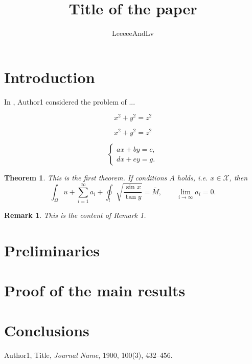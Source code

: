 \documentclass{article}
\title{Title of the paper}
\author{LeeeeeAndLv}
\date{}
\newtheorem{thm}{Theorem}
\newtheorem{rmk}{Remark}[section]
\begin{document}
\maketitle

\section{Introduction}

In \cite{Au1900}, Author1 considered the problem of ...

\begin{equation*}
	x^2 + y^2 = z^2
\end{equation*}

\begin{equation}\label{eq:GouGuThm}
	x^2 + y^2 = z^2
\end{equation}

\[
	\left\{
	\begin{aligned}
		a x + b y = c, \\
		d x + e y = g.
	\end{aligned}
	\right.
\]

\begin{thm}
	This is the first theorem. If conditions $A$ holds, i.e. $x\in \mathcal{X}$, then
	\[
		\int_\Omega u + \sum_{i=1}^\infty a_i + \oint_l \sqrt{\frac{\sin x}{\tan y}} = \bar{M}, \qquad \lim_{i\to \infty} a_i = 0.
	\]
\end{thm}

\begin{rmk}
	This is the content of Remark 1. 
\end{rmk}


\section{Preliminaries}

\section{Proof of the main results}

\section{Conclusions}

\begin{thebibliography}{99}
	Author1, Title, {\it Journal Name}, 1900, 100(3), 432--456.  
\end{thebibliography}
\end{document}
